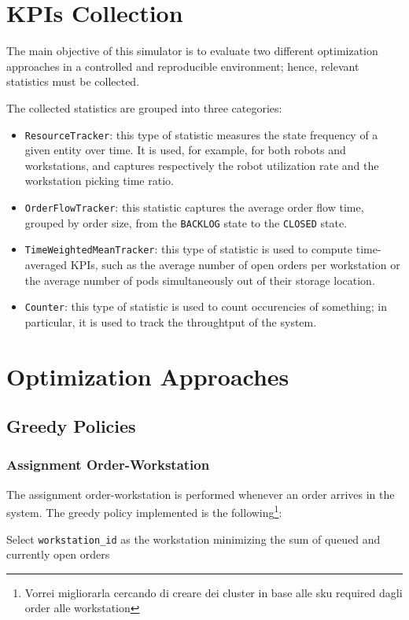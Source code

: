 \documentclass[a4paper,10pt]{article}
\begin{document}
\section{KPIs Collection}
The main objective of this simulator is to evaluate two different optimization approaches in a controlled and reproducible environment; hence, relevant statistics must be collected.

The collected statistics are grouped into three categories:
\begin{itemize}
    \item \texttt{ResourceTracker}: this type of statistic measures the state frequency of a given entity over time. It is used, for example, for both robots and workstations, and captures respectively the robot utilization rate and the workstation picking time ratio.
    \item \texttt{OrderFlowTracker}: this statistic captures the average order flow time, grouped by order size, from the \texttt{BACKLOG} state to the \texttt{CLOSED} state.
    \item \texttt{TimeWeightedMeanTracker}: this type of statistic is used to compute time-averaged KPIs, such as the average number of open orders per workstation or the average number of pods simultaneously out of their storage location.
    \item \texttt{Counter}: this type of statistic is used to count occurencies of something; in particular, it is used to track the throughtput of the system.
\end{itemize}




\newpage
\section{Optimization Approaches}
\subsection{Greedy Policies}

\subsubsection{Assignment Order-Workstation}
The assignment order-workstation is performed whenever an order arrives in the system.  
The greedy policy implemented is the following\footnote{Vorrei migliorarla cercando di creare dei cluster in base alle sku required dagli order alle workstation}:
\begin{algorithm}
\caption{Assignment order-workstation}
\begin{algorithmic}[1]
\State Select \texttt{workstation\_id} as the workstation minimizing the sum of queued and currently open orders
\end{algorithmic}
\end{algorithm}
\end{document}
